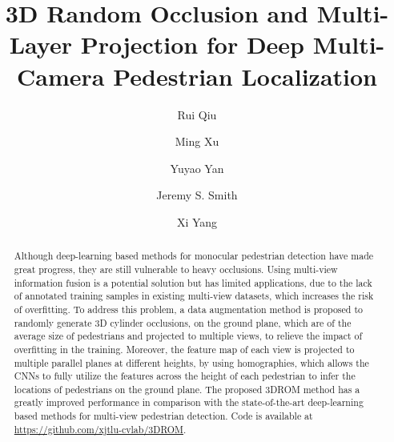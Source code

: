 \documentclass[runningheads]{llncs}
\begin{document}
\pagestyle{headings}
	\mainmatter
	\def\ECCVSubNumber{7417}  

	\title{3D Random Occlusion and Multi-Layer Projection for Deep Multi-Camera Pedestrian Localization} 

\begin{comment}
	\titlerunning{ECCV-22 submission ID \ECCVSubNumber}
	\authorrunning{ECCV-22 submission ID \ECCVSubNumber}
	\author{Anonymous ECCV submission}
	\institute{Paper ID \ECCVSubNumber}
	\end{comment}


\author{Rui Qiu \and
		Ming Xu \and
		Yuyao Yan \and
		Jeremy S. Smith \and
		Xi Yang}


	\maketitle
	
	\renewcommand{\thefootnote}{}
	
	\begin{abstract}
		Although deep-learning based methods for monocular pedestrian detection have made great progress, they are still vulnerable to heavy occlusions. Using multi-view information fusion is a potential solution but has limited applications, due to the lack of annotated training samples in existing multi-view datasets, which increases the risk of overfitting. To address this problem, a data augmentation method is proposed to randomly generate 3D cylinder occlusions, on the ground plane, which are of the average size of pedestrians and projected to multiple views, to relieve the impact of overfitting in the training. Moreover, the feature map of each view is projected to multiple parallel planes at different heights, by using homographies, which allows the CNNs to fully utilize the features across the height of each pedestrian to infer the locations of pedestrians on the ground plane. The proposed 3DROM method has a greatly improved performance in comparison with the state-of-the-art deep-learning based methods for multi-view pedestrian detection. Code is available at \url{https://github.com/xjtlu-cvlab/3DROM}.
		
	\end{abstract}
	
\end{document}
